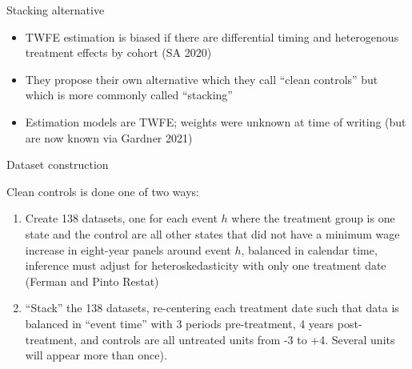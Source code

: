\documentclass{beamer}
\begin{document}


\begin{frame}{Stacking alternative}

\begin{itemize}
\item TWFE estimation is biased if there are differential timing and heterogenous treatment effects by cohort (SA 2020)
\item They propose their own alternative which they call ``clean controls'' but which is more commonly called ``stacking''
\item Estimation models are TWFE; weights were unknown at time of writing (but are now known via Gardner 2021)
\end{itemize}

\end{frame}

\begin{frame}{Dataset construction}

Clean controls is done one of two ways:
	\begin{enumerate}
	\item Create 138 datasets, one for each event $h$ where the treatment group is one state and the control are all other states that did not have a minimum wage increase in eight-year panels around event $h$, balanced in calendar time, inference must adjust for heteroskedasticity with only one treatment date (Ferman and Pinto Restat)
	\item ``Stack'' the 138 datasets, re-centering each treatment date such that data is balanced in ``event time'' with 3 periods pre-treatment, 4 years post-treatment, and controls are all untreated units from -3 to +4. Several units will appear more than once).
	\end{enumerate}
\bigskip

\end{frame}
\end{document}
